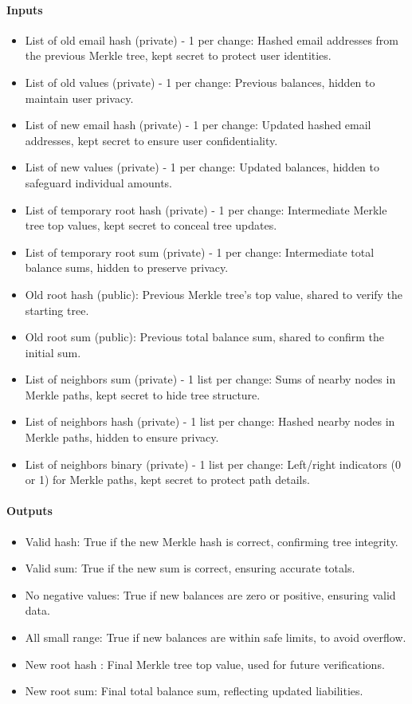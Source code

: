 \paragraph{Inputs}
\begin{itemize}
   \item List of old email hash (private) - 1 per change: Hashed email addresses from the previous Merkle tree, kept secret to protect user identities.
   \item List of old values (private) - 1 per change: Previous balances, hidden to maintain user privacy.
   \item List of new email hash (private) - 1 per change: Updated hashed email addresses, kept secret to ensure user confidentiality.
   \item List of new values (private) - 1 per change: Updated balances, hidden to safeguard individual amounts.
   \item List of temporary root hash (private) - 1 per change: Intermediate Merkle tree top values, kept secret to conceal tree updates.
   \item List of temporary root sum (private) - 1 per change: Intermediate total balance sums, hidden to preserve privacy.
   \item Old root hash (public): Previous Merkle tree’s top value, shared to verify the starting tree.
   \item Old root sum (public): Previous total balance sum, shared to confirm the initial sum.
   \item List of neighbors sum (private) - 1 list per change: Sums of nearby nodes in Merkle paths, kept secret to hide tree structure.
   \item List of neighbors hash (private) - 1 list per change: Hashed nearby nodes in Merkle paths, hidden to ensure privacy.
   \item List of neighbors binary (private) - 1 list per change: Left/right indicators (0 or 1) for Merkle paths, kept secret to protect path details.
\end{itemize}

\paragraph{Outputs}
\begin{itemize}
   \item Valid hash: True if the new Merkle hash is correct, confirming tree integrity.
   \item Valid sum: True if the new sum is correct, ensuring accurate totals.
   \item No negative values: True if new balances are zero or positive, ensuring valid data.
   \item All small range: True if new balances are within safe limits, to avoid overflow.
   \item New root hash : Final Merkle tree top value, used for future verifications.
   \item New root sum: Final total balance sum, reflecting updated liabilities.
   \end{itemize}

